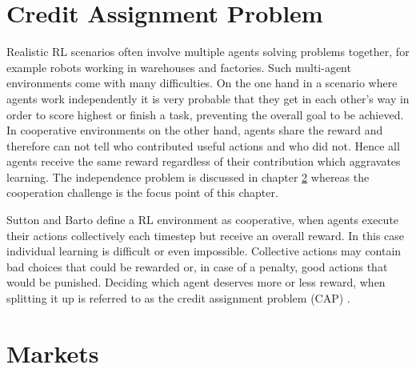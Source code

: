\section{Credit Assignment Problem}
Realistic RL scenarios often involve multiple agents solving problems together, for
example robots working in warehouses and factories. Such multi-agent environments come
with many difficulties. On the one hand
in a scenario where agents work independently it is very probable that they get in
each other's way in order to score highest or finish a task, preventing the overall
goal to be achieved.
In cooperative environments on the other hand, agents share the reward and therefore
can not tell who contributed useful actions and who did not. Hence all agents receive
the same reward regardless of their contribution which aggravates learning.
The independence problem is discussed in chapter \ref{market}
whereas the cooperation challenge is the focus point of this chapter.

Sutton and Barto \cite{suba18} define a RL environment as cooperative, when agents
execute their actions collectively each timestep but receive an overall reward. In
this case individual learning is difficult or even impossible. Collective actions may
contain bad choices that could be rewarded or, in case of a penalty, good actions
that would be punished. Deciding which agent deserves more or less reward, when
splitting it up is referred to as the credit assignment problem (CAP) \cite{mi61}.


\section{Markets}\label{market}
